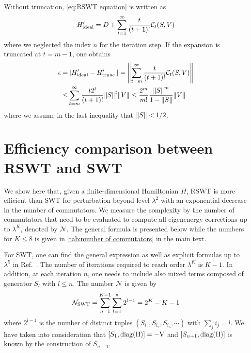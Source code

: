 \documentclass[%
 reprint,
 amsmath,amssymb,
 aps,
pra,
noeprint,
superscriptaddress,
]{revtex4-2}
\begin{document}
Without truncation, \cref{eq:RSWT equation} is written as
\begin{equation}
    H'_{\rm{ideal}} = D + \sum_{t=1}^{\infty} \frac{t}{(t+1)!} \mathcal{C}_t(S, V)
\end{equation}
where we neglected the index $n$ for the iteration step.
If the expansion is truncated at $t=m-1$, one obtains
\begin{align}
    \epsilon = &
    \norm{
        H'_{\rm{ideal}} - H'_{\rm{trunc}}
    }
    =
    \norm{
        \sum_{t=m}^{\infty} \frac{t}{(t+1)!} \mathcal{C}_t(S, V)
    }
    \\ \nonumber
    \le &
    \sum_{t=m}^{\infty}
    \frac{t2^t}{(t+1)!}
    \norm{S}^t \norm{V}
    \le
    \frac{2^m}{m!}
    \frac{\norm{S}^m}{1-\norm{S}}
    \norm{V}
\end{align}
where we assume in the last inequality that $\norm{S}<1/2$.


\section{Efficiency comparison between RSWT and SWT}
\label{sec:number of commutators}
We show here that, given a finite-dimensional Hamiltonian $H$, RSWT is more efficient than SWT for perturbation beyond level $\lambda^2$ with an exponential decrease in the number of commutators.
We measure the complexity by the number of commutators that need to be evaluated to compute all eigenenergy corrections up to $\lambda^K$, denoted by $\mathcal{N}$.
The general formula is presented below while the numbers for $K \le 8$ is given in \cref{tab:number of commutators} in the main text.

For SWT, one can find the general expression as well as explicit formulas up to $\lambda^5$ in Ref.~\cite{Magesan2020}.
The number of iterations required to reach order $\lambda^K$ is $K-1$.
In addition, at each iteration $n$, one needs to include also mixed terms composed of generator $S_l$ with $l \le n$.
The number $\mathcal{N}$ is given by
\begin{equation}
    \mathcal{N}_{\rm{SWT}}
    =
    \sum_{n=1}^{K-1} \sum_{l=1}^n 2^{l-1}
    =
    2^K-K-1
\end{equation}
where $2^{l-1}$ is the number of distinct tuples $(S_{i_1}, S_{i_2}, S_{i_3}, \cdots)$ with $\sum_j{i_j}=l$.
We have taken into consideration that $[S_1, \rm{diag}(H)]=-V$ and $[S_{n+1}, \rm{diag}(H)]$ is known by the construction of $S_{n+1}$.
\end{document}
